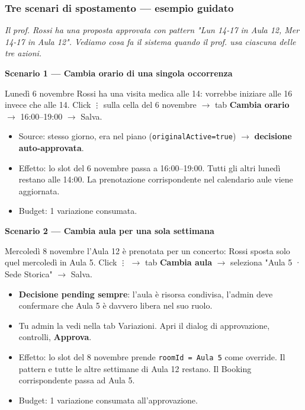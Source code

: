 \documentclass[11pt,a4paper]{article}
\renewenvironment{quote}
  {\begin{list}{}{%
      \setlength{\leftmargin}{8pt}%
      \setlength{\rightmargin}{8pt}%
      \setlength{\topsep}{6pt}%
      \setlength{\parsep}{0pt}}%
      \item\relax\color{black!75}\itshape}
  {\end{list}}
\begin{document}
\subsubsection{Tre scenari di spostamento --- esempio guidato}


\begin{quote}
Il prof. Rossi ha una proposta approvata con pattern "Lun 14-17 in Aula 12, Mer 14-17 in Aula 12". Vediamo cosa fa il sistema quando il prof. usa ciascuna delle tre azioni.
\end{quote}

\textbf{Scenario 1 --- Cambia orario di una singola occorrenza}

Lunedì 6 novembre Rossi ha una visita medica alle 14: vorrebbe iniziare alle 16 invece che alle 14. Click \texttt{⋮} sulla cella del 6 novembre $\rightarrow$ tab \textbf{Cambia orario} $\rightarrow$ 16:00--19:00 $\rightarrow$ Salva.

\begin{itemize}
  \item Source: stesso giorno, era nel piano (\texttt{originalActive=true}) $\rightarrow$ \textbf{decisione auto-approvata}.
  \item Effetto: lo slot del 6 novembre passa a 16:00--19:00. Tutti gli altri lunedì restano alle 14:00. La prenotazione corrispondente nel calendario aule viene aggiornata.
  \item Budget: 1 variazione consumata.
\end{itemize}

\textbf{Scenario 2 --- Cambia aula per una sola settimana}

Mercoledì 8 novembre l'Aula 12 è prenotata per un concerto: Rossi sposta solo quel mercoledì in Aula 5. Click \texttt{⋮} $\rightarrow$ tab \textbf{Cambia aula} $\rightarrow$ seleziona "Aula 5 · Sede Storica" $\rightarrow$ Salva.

\begin{itemize}
  \item \textbf{Decisione pending sempre}: l'aula è risorsa condivisa, l'admin deve confermare che Aula 5 è davvero libera nel suo ruolo.
  \item Tu admin la vedi nella tab Variazioni. Apri il dialog di approvazione, controlli, \textbf{Approva}.
  \item Effetto: lo slot del 8 novembre prende \texttt{roomId = Aula 5} come override. Il pattern e tutte le altre settimane di Aula 12 restano. Il Booking corrispondente passa ad Aula 5.
  \item Budget: 1 variazione consumata all'approvazione.
\end{itemize}
\end{document}
